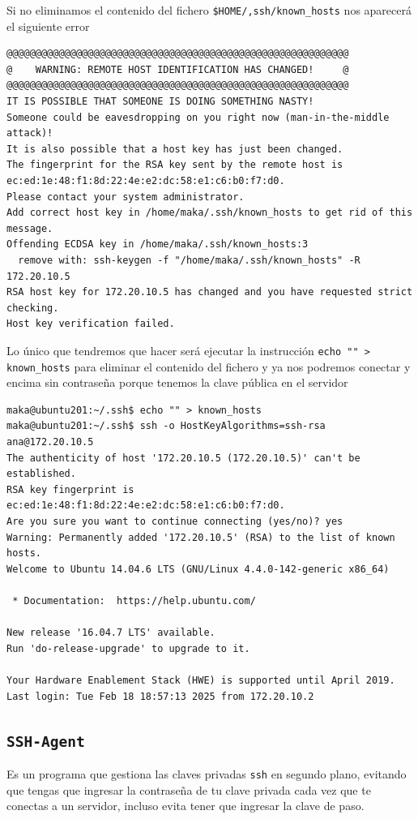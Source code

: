 \documentclass[11pt]{article}
\begin{document}
Si no eliminamos el contenido del fichero \texttt{\$HOME/,ssh/known\_hosts} nos aparecerá el siguiente error
\begin{verbatim}
@@@@@@@@@@@@@@@@@@@@@@@@@@@@@@@@@@@@@@@@@@@@@@@@@@@@@@@@@@@
@    WARNING: REMOTE HOST IDENTIFICATION HAS CHANGED!     @
@@@@@@@@@@@@@@@@@@@@@@@@@@@@@@@@@@@@@@@@@@@@@@@@@@@@@@@@@@@
IT IS POSSIBLE THAT SOMEONE IS DOING SOMETHING NASTY!
Someone could be eavesdropping on you right now (man-in-the-middle attack)!
It is also possible that a host key has just been changed.
The fingerprint for the RSA key sent by the remote host is
ec:ed:1e:48:f1:8d:22:4e:e2:dc:58:e1:c6:b0:f7:d0.
Please contact your system administrator.
Add correct host key in /home/maka/.ssh/known_hosts to get rid of this message.
Offending ECDSA key in /home/maka/.ssh/known_hosts:3
  remove with: ssh-keygen -f "/home/maka/.ssh/known_hosts" -R 172.20.10.5
RSA host key for 172.20.10.5 has changed and you have requested strict checking.
Host key verification failed.
\end{verbatim}

Lo único que tendremos que hacer será ejecutar la instrucción \texttt{echo "" > known\_hosts} para eliminar el contenido del fichero y ya nos podremos conectar y encima sin contraseña porque tenemos
la clave pública en el servidor
\begin{verbatim}
maka@ubuntu201:~/.ssh$ echo "" > known_hosts 
maka@ubuntu201:~/.ssh$ ssh -o HostKeyAlgorithms=ssh-rsa ana@172.20.10.5
The authenticity of host '172.20.10.5 (172.20.10.5)' can't be established.
RSA key fingerprint is ec:ed:1e:48:f1:8d:22:4e:e2:dc:58:e1:c6:b0:f7:d0.
Are you sure you want to continue connecting (yes/no)? yes
Warning: Permanently added '172.20.10.5' (RSA) to the list of known hosts.
Welcome to Ubuntu 14.04.6 LTS (GNU/Linux 4.4.0-142-generic x86_64)

 * Documentation:  https://help.ubuntu.com/

New release '16.04.7 LTS' available.
Run 'do-release-upgrade' to upgrade to it.

Your Hardware Enablement Stack (HWE) is supported until April 2019.
Last login: Tue Feb 18 18:57:13 2025 from 172.20.10.2
\end{verbatim}
\subsection{\texttt{SSH-Agent}}
\label{sec:orge3c2828}
Es un programa que gestiona las claves privadas \texttt{ssh} en segundo plano, evitando que tengas que ingresar la contraseña de tu clave privada cada vez que te conectas a un servidor, incluso evita
tener que ingresar la clave de paso.
\end{document}
